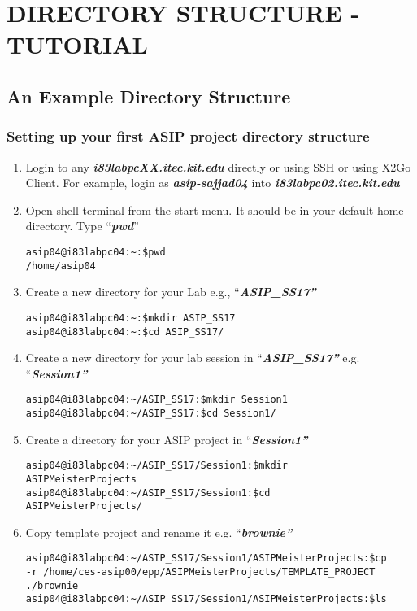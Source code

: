 \chapter*{DIRECTORY STRUCTURE -TUTORIAL}
\section*{An Example Directory Structure}
\subsection{Setting up your first ASIP project directory structure}
\begin{enumerate}
	\item Login to any \emph{\textbf{i83labpcXX.itec.kit.edu}} directly or using SSH or using X2Go Client. For example, login as \emph{\textbf{asip-sajjad04}} into
	\emph{\textbf{i83labpc02.itec.kit.edu}}
	\item Open shell terminal from the start menu. It should be in your default
	home directory. Type ``\emph{\textbf{pwd}}''
\begin{lstlisting}
asip04@i83labpc04:~:$pwd
/home/asip04
\end{lstlisting}
	\item Create a new directory for your Lab e.g., ``\emph{\textbf{ASIP\_SS17''}}
\begin{lstlisting}
asip04@i83labpc04:~:$mkdir ASIP_SS17
asip04@i83labpc04:~:$cd ASIP_SS17/
\end{lstlisting}
	\item Create a new directory for your lab session in ``\emph{\textbf{ASIP\_SS17''}} e.g. ``\emph{\textbf{Session1''}}
\begin{lstlisting}
asip04@i83labpc04:~/ASIP_SS17:$mkdir Session1
asip04@i83labpc04:~/ASIP_SS17:$cd Session1/
\end{lstlisting}
	\item Create a directory for your ASIP project in ``\emph{\textbf{Session1''}}
\begin{lstlisting}
asip04@i83labpc04:~/ASIP_SS17/Session1:$mkdir
ASIPMeisterProjects
asip04@i83labpc04:~/ASIP_SS17/Session1:$cd
ASIPMeisterProjects/
\end{lstlisting}
	\item Copy template project and rename it e.g. ``\emph{\textbf{brownie''}}
\begin{lstlisting}
asip04@i83labpc04:~/ASIP_SS17/Session1/ASIPMeisterProjects:$cp
-r /home/ces-asip00/epp/ASIPMeisterProjects/TEMPLATE_PROJECT ./brownie
asip04@i83labpc04:~/ASIP_SS17/Session1/ASIPMeisterProjects:$ls

\end{lstlisting}
\end{enumerate}
